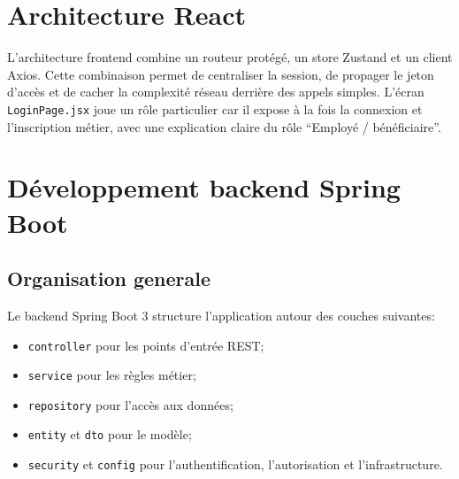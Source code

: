 \begin{codeblock}[H]
\caption{Implémentation de la page Dashboard en React}

\end{codeblock}

\section{Architecture React}
L'architecture frontend combine un routeur protégé, un store Zustand et un client Axios. Cette combinaison permet de centraliser la session, de propager le jeton d'accès et de cacher la complexité réseau derrière des appels simples. L'écran \texttt{LoginPage.jsx} joue un rôle particulier car il expose à la fois la connexion et l'inscription métier, avec une explication claire du rôle \enquote{Employé / bénéficiaire}.

\section{Développement backend Spring Boot}
\subsection{Organisation generale}
Le backend Spring Boot 3 structure l'application autour des couches suivantes:
\begin{itemize}
  \item \texttt{controller} pour les points d'entrée REST;
  \item \texttt{service} pour les règles métier;
  \item \texttt{repository} pour l'accès aux données;
  \item \texttt{entity} et \texttt{dto} pour le modèle;
  \item \texttt{security} et \texttt{config} pour l'authentification, l'autorisation et l'infrastructure.
\end{itemize}

